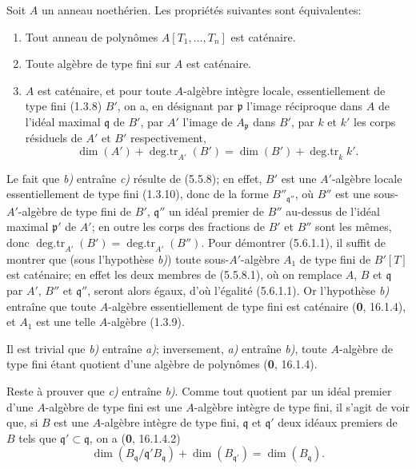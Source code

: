 \begin{proposition}[5.6.1]
Soit $A$ un anneau noethérien. Les propriétés suivantes sont équivalentes:
\begin{enumerate}
\item[\textup{a)}] Tout anneau de polynômes $A[T_1,\ldots,T_n]$ est caténaire.
\item[\textup{b)}] Toute algèbre de type fini sur $A$ est caténaire.
\item[\textup{c)}] $A$ est caténaire, et pour toute $A$-algèbre intègre locale,
essentiellement de type fini \textup{(1.3.8)} $B'$, on a, en désignant par
$\mathfrak p$ l'image réciproque dans $A$ de l'idéal maximal $\mathfrak q$
de $B'$, par $A'$ l'image de $A_{\mathfrak p}$ dans $B'$, par $k$ et $k'$
les corps résiduels de $A'$ et $B'$ respectivement,
\begin{equation}
\dim(A')+\operatorname{deg.tr}_{A'}(B')
=\dim(B')+\operatorname{deg.tr}_k k'.
\tag{5.6.1.1}\label{IV.2.s5.6.1.1-fr}
\end{equation}
\end{enumerate}
\end{proposition}

Le fait que \emph{b)} entraîne \emph{c)} résulte de (5.5.8); en effet, $B'$ est une
$A'$-algèbre locale essentiellement de type fini (1.3.10), donc de la forme
$B''_{\mathfrak q''}$, où $B''$ est une sous-$A'$-algèbre de type fini de
$B'$, $\mathfrak q''$ un idéal premier de $B''$ au-dessus de l'idéal maximal
$\mathfrak p'$ de $A'$; en outre les corps des fractions de $B'$ et $B''$
sont les mêmes, donc
$\operatorname{deg.tr}_{A'}(B')=\operatorname{deg.tr}_{A'}(B'')$.
Pour démontrer (5.6.1.1), il suffit de montrer que (sous l'hypothèse \emph{b)}) toute
sous-$A'$-algèbre $A_1$ de type fini de $B'[T]$ est caténaire; en effet les
deux membres de (5.5.8.1), où on remplace $A$, $B$ et $\mathfrak q$ par
$A'$, $B''$ et $\mathfrak q''$, seront alors égaux, d'où l'égalité (5.6.1.1).
Or l'hypothèse \emph{b)} entraîne que toute $A$-algèbre essentiellement de type fini
est caténaire (\textbf{0}, 16.1.4), et $A_1$ est une telle $A$-algèbre (1.3.9).

Il est trivial que \emph{b)} entraîne \emph{a)}; inversement, \emph{a)} entraîne \emph{b)}, toute
$A$-algèbre de type fini étant quotient d'une algèbre de polynômes
(\textbf{0}, 16.1.4).

Reste à prouver que \emph{c)} entraîne \emph{b)}. Comme tout quotient par un idéal premier
d'une $A$-algèbre de type fini est une $A$-algèbre intègre de type fini, il
s'agit de voir que, si $B$ est une $A$-algèbre intègre de type fini,
$\mathfrak q$ et $\mathfrak q'$ deux idéaux premiers de $B$ tels que
$\mathfrak q'\subset\mathfrak q$, on a (\textbf{0}, 16.1.4.2)
\begin{equation}
\dim(B_{\mathfrak q}/\mathfrak q'B_{\mathfrak q})
+\dim(B_{\mathfrak q'})=\dim(B_{\mathfrak q}).
\tag{5.6.1.2}\label{IV.2.s5.6.1.2-fr}
\end{equation}

